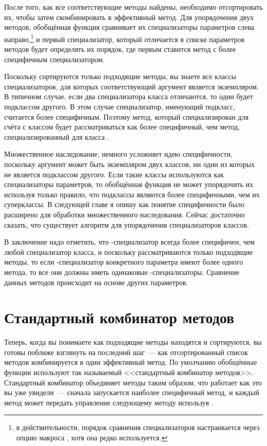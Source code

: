 После того, как все соответствующие методы найдены, необходимо отсортировать их, чтобы
затем скомбинировать в эффективный метод.  Для упорядочения двух методов, обобщённая
функция сравнивает их специализаторы параметров слева направо,\footnote{в
  действительности, порядок сравнения специализаторов настраивается через опцию
   макроса , хотя она редко
  используется.} и первый специализатор, который отличается в списке параметров методов
будет определять их порядок, где первым ставится метод с более специфичным
специализатором.

Поскольку сортируются только подходящие методы, вы знаете все классы специализаторов, для
которых соответствующий аргумент является экземпляром.  В типичном случае, если два
специализатора класса отличаются, то один будет подклассом другого.  В этом случае
специализатор, именующий подкласс, считается более специфичным.  Поэтому метод, который
специализирован для счёта с классом  будет рассматриваться как
более специфичный, чем метод, специализированный для класса .

Множественное наследование, немного усложняет идею специфичности, поскольку аргумент может
быть экземпляром двух классов, ни один из которых не является подклассом другого.  Если
такие классы используются как специализаторы параметров, то обобщённая функция не может
упорядочить их используя только правило, что подклассы являются более специфичными, чем их
суперклассы.  В следующей главе я опишу как понятие специфичности было расширено для
обработки множественного наследования.  Сейчас достаточно сказать, что существует алгоритм
для упорядочения специализаторов классов.

В заключение надо отметить, что -специализатор всегда более специфичен, чем
любой специализатор класса, и поскольку рассматриваются только подходящие методы, то если
-специализатор конкретного параметра имеют более одного метода, то все они
должны иметь одинаковые -специализаторы.  Сравнение данных методов происходит на
основе других параметров.

\section{Стандартный комбинатор методов}

Теперь, когда вы понимаете как подходящие методы находятся и сортируются, вы готовы
поближе взглянуть на последний шаг~--- как отсортированный список методов комбинируется в
один эффективный метод.  По умолчанию обобщённые функции используют так называемый
<<стандартный комбинатор методов>>.  Стандартный комбинатор объединяет методы таким образом,
что  работает как это вы уже увидели~--- сначала запускается
наиболее специфичный метод, и каждый метод может передать управление следующему методу
используя .

